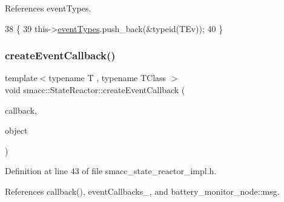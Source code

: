 References event\+Types.


\begin{DoxyCode}
38 \{
39     this->\hyperlink{classsmacc_1_1StateReactor_a65c8ddfce40e7859e5c73fff1cf6c04b}{eventTypes}.push\_back(&\textcolor{keyword}{typeid}(TEv));
40 \}
\end{DoxyCode}
\mbox{\label{classsmacc_1_1StateReactor_a68482e08f6449694a0bcda843b14b376}} 
\subsubsection{\texorpdfstring{create\+Event\+Callback()}{createEventCallback()}\hspace{0.1cm}{\footnotesize\ttfamily [1/2]}}
{\footnotesize\ttfamily template$<$typename T , typename T\+Class $>$ \\
void smacc\+::\+State\+Reactor\+::create\+Event\+Callback (\begin{DoxyParamCaption}\item[{void(T\+Class\+::$\ast$)(T $\ast$)}]{callback,  }\item[{T\+Class $\ast$}]{object }\end{DoxyParamCaption})}



Definition at line 43 of file smacc\+\_\+state\+\_\+reactor\+\_\+impl.\+h.



References callback(), event\+Callbacks\+\_\+, and battery\+\_\+monitor\+\_\+node\+::msg.


